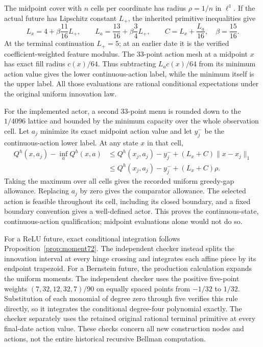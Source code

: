 The midpoint cover with $n$ cells per coordinate has radius $\rho=1/n$ in $\ell^1$. If the actual future has Lipschitz constant $L_+$, the inherited primitive inequalities give
\[
 L_x=4+\beta\frac{11}{16}L_+,
 \qquad L_a=\frac{13}{16}+\beta\frac34L_+,
 \qquad C=L_x+\frac{L_a}{16},\quad\beta=\frac{15}{16}.
\]
At the terminal continuation $L_+=5$; at an earlier date it is the verified coefficient-weighted feature modulus. The 33-point action mesh at a midpoint $x$ has exact fill radius $c(x)/64$. Thus subtracting $L_ac(x)/64$ from its minimum action value gives the lower continuous-action label, while the minimum itself is the upper label. All those evaluations are rational conditional expectations under the original uniform innovation law.

For the implemented actor, a second 33-point menu is rounded down to the $1/4096$ lattice and bounded by the minimum capacity over the whole observation cell. Let $a_j$ minimize its exact midpoint action value and let $y_j^-$ be the continuous-action lower label. At any state $x$ in that cell,
\begin{align*}
 Q^h(x,a_j)-\inf_a Q^h(x,a)
 &\le Q^h(x_j,a_j)-y_j^-+(L_x+C)\|x-x_j\|_1\\
 &\le Q^h(x_j,a_j)-y_j^-+(L_x+C)\rho.
\end{align*}
Taking the maximum over all cells gives the recorded uniform greedy-gap allowance. Replacing $a_j$ by zero gives the comparator allowance. The selected action is feasible throughout its cell, including its closed boundary, and a fixed boundary convention gives a well-defined actor. This proves the continuous-state, continuous-action qualification; midpoint evaluations alone would not do so.

For a ReLU future, exact conditional integration follows Proposition~\ref{prop:moment72}. The independent checker instead splits the innovation interval at every hinge crossing and integrates each affine piece by its endpoint trapezoid. For a Bernstein future, the production calculation expands the uniform moments. The independent checker uses the positive five-point weights $(7,32,12,32,7)/90$ on equally spaced points from $-1/32$ to $1/32$. Substitution of each monomial of degree zero through five verifies this rule directly, so it integrates the conditional degree-four polynomial exactly. The checker separately uses the retained original rational terminal primitive at every final-date action value. These checks concern all new construction nodes and actions, not the entire historical recursive Bellman computation.

